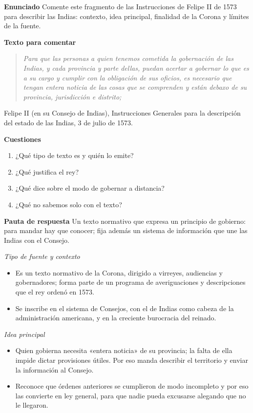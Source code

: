 \documentclass{book}
\begin{document}
\begin{tcolorbox}[title={Ejercicio resuelto}, studiumworked, breakable]

\noindent\textbf{Enunciado}
Comente este fragmento de las Instrucciones de Felipe II de 1573 para describir las Indias: contexto, idea principal, finalidad de la Corona y límites de la fuente.


\noindent\textbf{Texto para comentar}

\begin{quote}
\itshape Para que las personas a quien tenemos cometida la gobernación de las Indias, y cada provincia y parte dellas, puedan acertar a gobernar lo que es a su cargo y cumplir con la obligación de sus oficios, es necesario que tengan entera noticia de las cosas que se comprenden y están debaxo de su provincia, jurisdicción e distrito;
\end{quote}
{\noindent\footnotesize Felipe II (en su Consejo de Indias), Instrucciones Generales para la descripción del estado de las Indias, 3 de julio de 1573.\par}

\noindent\textbf{Cuestiones}
\begin{enumerate}
\item ¿Qué tipo de texto es y quién lo emite?
\item ¿Qué justifica el rey?
\item ¿Qué dice sobre el modo de gobernar a distancia?
\item ¿Qué no sabemos solo con el texto?
\end{enumerate}

\noindent\textbf{Pauta de respuesta}
Un texto normativo que expresa un principio de gobierno: para mandar hay que conocer; fija además un sistema de información que une las Indias con el Consejo.


\noindent\textit{Tipo de fuente y contexto}
\begin{itemize}
\item Es un texto normativo de la Corona, dirigido a virreyes, audiencias y gobernadores; forma parte de un programa de averiguaciones y descripciones que el rey ordenó en 1573.
\item Se inscribe en el sistema de Consejos, con el de Indias como cabeza de la administración americana, y en la creciente burocracia del reinado.
\end{itemize}

\noindent\textit{Idea principal}
\begin{itemize}
\item Quien gobierna necesita «entera noticia» de su provincia; la falta de ella impide dictar provisiones útiles. Por eso manda describir el territorio y enviar la información al Consejo.
\item Reconoce que órdenes anteriores se cumplieron de modo incompleto y por eso las convierte en ley general, para que nadie pueda excusarse alegando que no le llegaron.
\end{itemize}


\end{tcolorbox}
\end{document}
